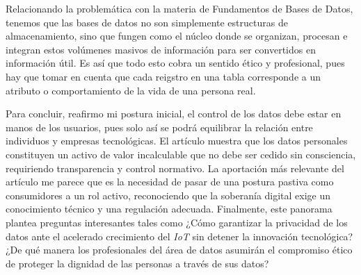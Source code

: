 Relacionando la problemática con la materia de Fundamentos de Bases de Datos, tenemos que las bases de datos no son simplemente estructuras de almacenamiento, sino que fungen como el núcleo donde se organizan, procesan e integran estos volúmenes masivos de información para ser convertidos en información útil. Es así que todo esto cobra un sentido ético y profesional, pues hay que tomar en cuenta que cada reigstro en una tabla corresponde a un atributo o comportamiento de la vida de una persona real.

Para concluir, reafirmo mi postura inicial, el control de los datos debe estar en manos de los usuarios, pues solo así se podrá equilibrar la relación entre individuos y empresas tecnológicas. El artículo muestra que los datos personales constituyen un activo de valor incalculable que no debe ser cedido sin consciencia, requiriendo transparencia y control normativo. La aportación más relevante del artículo me parece que es la necesidad de pasar de una postura pastiva como consumidores a un rol activo, reconociendo que la soberanía digital exige un conocimiento técnico y una regulación adecuada. Finalmente, este panorama plantea preguntas interesantes tales como ¿Cómo garantizar la privacidad de los datos ante el acelerado crecimiento del \textit{IoT} sin detener la innovación tecnológica? ¿De qué manera los profesionales del área de datos asumirán el compromiso ético de proteger la dignidad de las personas a través de sus datos?